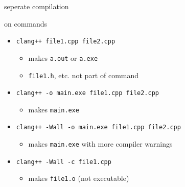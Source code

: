 \begin{frame}{seperate compilation}
\end{frame}

\begin{frame}{on commands}
    \begin{itemize}
    \item {\tt clang++ file1.cpp file2.cpp} 
        \begin{itemize}
        \item makes {\tt a.out} or {\tt a.exe}
        \item {\tt file1.h}, etc. not part of command 
        \end{itemize}
    \item {\tt clang++ -o main.exe file1.cpp file2.cpp} 
        \begin{itemize}
        \item makes {\tt main.exe}
        \end{itemize}
    \item {\tt clang++ -Wall -o main.exe file1.cpp file2.cpp} 
        \begin{itemize}
        \item makes {\tt main.exe} with more compiler warnings
        \end{itemize}
    \item {\tt clang++ -Wall -c file1.cpp} 
        \begin{itemize}
        \item makes {\tt file1.o} (not executable)
        \end{itemize}
    \end{itemize}
\end{frame}
